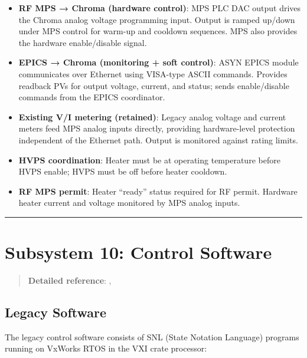 \begin{itemize}
\tightlist
\item
  \textbf{RF MPS → Chroma (hardware control)}: MPS PLC DAC output drives the Chroma analog voltage programming input. Output is ramped up/down under MPS control for warm-up and cooldown sequences. MPS also provides the hardware enable/disable signal.
\item
  \textbf{EPICS → Chroma (monitoring + soft control)}: ASYN EPICS module communicates over Ethernet using VISA-type ASCII commands. Provides readback PVs for output voltage, current, and status; sends enable/disable commands from the EPICS coordinator.
\item
  \textbf{Existing V/I metering (retained)}: Legacy analog voltage and current meters feed MPS analog inputs directly, providing hardware-level protection independent of the Ethernet path. Output is monitored against rating limits.
\item
  \textbf{HVPS coordination}: Heater must be at operating temperature before HVPS enable; HVPS must be off before heater cooldown.
\item
  \textbf{RF MPS permit}: Heater ``ready'' status required for RF permit. Hardware heater current and voltage monitored by MPS analog inputs.
\end{itemize}

\begin{center}\rule{0.5\linewidth}{0.5pt}\end{center}

\section{Subsystem 10: Control Software}\label{subsystem-10-control-software}

\begin{quote}
\textbf{Detailed reference}: , 
\end{quote}

\subsection{Legacy Software}\label{legacy-software}

The legacy control software consists of SNL (State Notation Language) programs running on VxWorks RTOS in the VXI crate processor:

